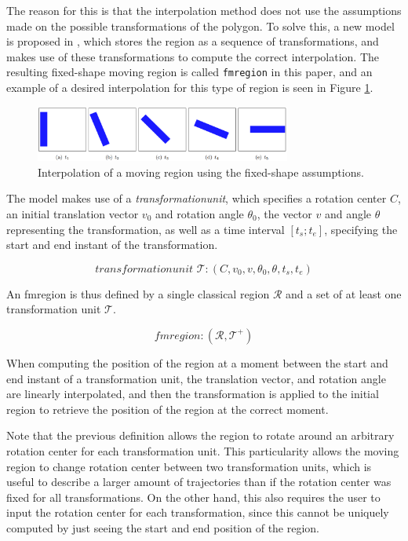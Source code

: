 The reason for this is that the interpolation method does not use the assumptions made on the possible transformations of the polygon. To solve this, a new model is proposed in \cite{fmregion}, which stores the region as a sequence of transformations, and makes use of these transformations to compute the correct interpolation. The resulting fixed-shape moving region is called \lstinline{fmregion} in this paper, and an example of a desired interpolation for this type of region is seen in Figure \ref{fig:fixed_shape_interpolation}.

\begin{figure}[h!]
    \centering
    \includegraphics[width=0.75\textwidth]{images/fixed_shape_interpolation.png}
    \caption[Linear interpolation of a fixed-shape moving region]{Interpolation of a moving region using the fixed-shape assumptions. \cite{fmregion}}
    \label{fig:fixed_shape_interpolation}
\end{figure}


The model makes use of a \textit{transformationunit}, which specifies a rotation center $C$, an initial translation vector $v_0$ and rotation angle $\theta_0$, the vector $v$ and angle $\theta$ representing the transformation, as well as a time interval $[t_s; t_e]$, specifying the start and end instant of the transformation.

\[
    \textit{transformationunit } \mathcal{T}: (C, v_0, v, \theta_0, \theta, t_{s}, t_{e})
\]

An fmregion is thus defined by a single classical region $\mathcal{R}$ and a set of at least one transformation unit $\mathcal{T}$.

\[
    \textit{fmregion} : (\mathcal{R}, \mathcal{T}^{+})
\]

When computing the position of the region at a moment between the start and end instant of a transformation unit, the translation vector, and rotation angle are linearly interpolated, and then the transformation is applied to the initial region to retrieve the position of the region at the correct moment.

Note that the previous definition allows the region to rotate around an arbitrary rotation center for each transformation unit. This particularity allows the moving region to change rotation center between two transformation units, which is useful to describe a larger amount of trajectories than if the rotation center was fixed for all transformations. On the other hand, this also requires the user to input the rotation center for each transformation, since this cannot be uniquely computed by just seeing the start and end position of the region.

